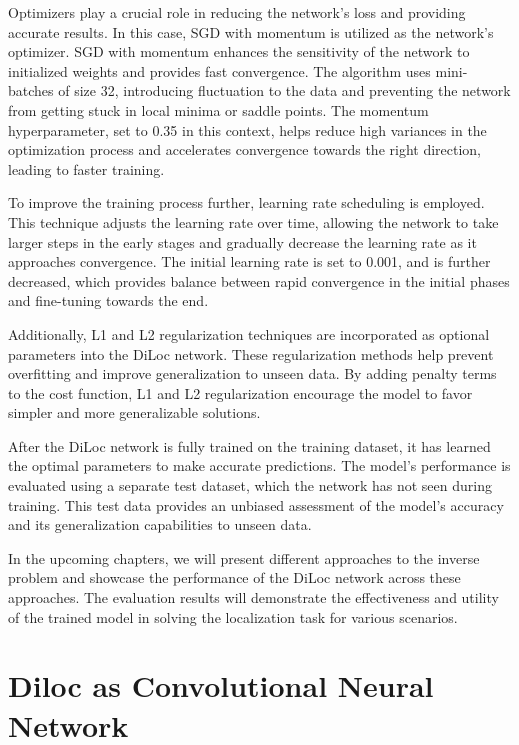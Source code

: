 \documentclass[a4paper, UKenglish, 11pt]{uiomaster}
\begin{document}
Optimizers play a crucial role in reducing the network's loss and providing accurate results. In this case, SGD with momentum is utilized as the network's optimizer. SGD with momentum enhances the sensitivity of the network to initialized weights and provides fast convergence. The algorithm uses mini-batches of size 32, introducing fluctuation to the data and preventing the network from getting stuck in local minima or saddle points. The momentum hyperparameter, set to 0.35 in this context, helps reduce high variances in the optimization process and accelerates convergence towards the right direction, leading to faster training.

To improve the training process further, learning rate scheduling is employed. This technique adjusts the learning rate over time, allowing the network to take larger steps in the early stages and gradually decrease the learning rate as it approaches convergence. The initial learning rate is set to 0.001, and is further decreased, which provides balance between rapid convergence in the initial phases and fine-tuning towards the end.

Additionally, L1 and L2 regularization techniques are incorporated as optional parameters into the DiLoc network. These regularization methods help prevent overfitting and improve generalization to unseen data. By adding penalty terms to the cost function, L1 and L2 regularization encourage the model to favor simpler and more generalizable solutions.

After the DiLoc network is fully trained on the training dataset, it has learned the optimal parameters to make accurate predictions. The model's performance is evaluated using a separate test dataset, which the network has not seen during training. This test data provides an unbiased assessment of the model's accuracy and its generalization capabilities to unseen data.

In the upcoming chapters, we will present different approaches to the inverse problem and showcase the performance of the DiLoc network across these approaches. The evaluation results will demonstrate the effectiveness and utility of the trained model in solving the localization task for various scenarios.

\section{Diloc as Convolutional Neural Network}
\end{document}
